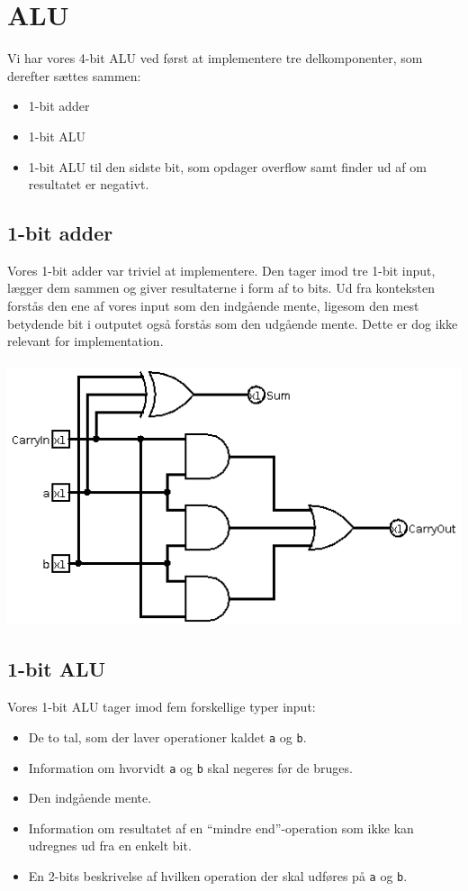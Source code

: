 \section{ALU}
Vi har vores 4-bit ALU ved først at implementere tre delkomponenter, som
derefter sættes sammen:
\begin{itemize}
\item 1-bit adder
\item 1-bit ALU
\item 1-bit ALU til den sidste bit, som opdager overflow samt finder ud af om
resultatet er negativt.
\end{itemize}

\subsection{1-bit adder}
Vores 1-bit adder var triviel at implementere. Den tager imod tre 1-bit input, lægger
dem sammen og giver resultaterne i form af to bits. Ud fra konteksten forstås
den ene af vores input som den indgående mente, ligesom den mest betydende bit i outputet
også forstås som den udgående mente. Dette er dog ikke relevant for
implementation. \\
\\
\includegraphics{Billeder/1bit-adder.png}

\subsection{1-bit ALU}
Vores 1-bit ALU tager imod fem forskellige typer input:
\begin{itemize}
\item De to tal, som der laver operationer kaldet {\tt a} og {\tt b}.
\item Information om hvorvidt {\tt a} og {\tt b} skal negeres før de bruges.
\item Den indgående mente.
\item Information om resultatet af en ``mindre end''-operation som ikke
kan udregnes ud fra en enkelt bit.
\item En 2-bits beskrivelse af hvilken operation der skal udføres på {\tt a} og
{\tt b}.
\end{itemize}

